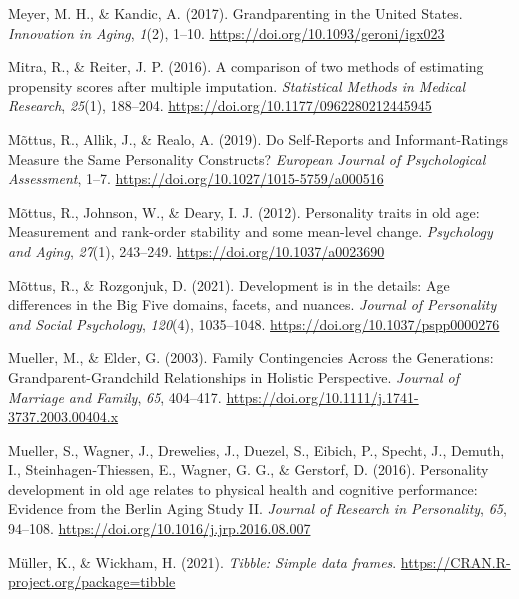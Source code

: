 \documentclass[
  english,
  man,floatsintext]{apa7}
\begin{document}
\leavevmode\hypertarget{ref-meyerGrandparentingUnitedStates2017}{}%
Meyer, M. H., \& Kandic, A. (2017). Grandparenting in the United States. \emph{Innovation in Aging}, \emph{1}(2), 1--10. \url{https://doi.org/10.1093/geroni/igx023}

\leavevmode\hypertarget{ref-mitraComparisonTwoMethods2016}{}%
Mitra, R., \& Reiter, J. P. (2016). A comparison of two methods of estimating propensity scores after multiple imputation. \emph{Statistical Methods in Medical Research}, \emph{25}(1), 188--204. \url{https://doi.org/10.1177/0962280212445945}

\leavevmode\hypertarget{ref-mottusSelfReportsInformantRatingsMeasure2019}{}%
Mõttus, R., Allik, J., \& Realo, A. (2019). Do Self-Reports and Informant-Ratings Measure the Same Personality Constructs? \emph{European Journal of Psychological Assessment}, 1--7. \url{https://doi.org/10.1027/1015-5759/a000516}

\leavevmode\hypertarget{ref-mottusPersonalityTraitsOld2012}{}%
Mõttus, R., Johnson, W., \& Deary, I. J. (2012). Personality traits in old age: Measurement and rank-order stability and some mean-level change. \emph{Psychology and Aging}, \emph{27}(1), 243--249. \url{https://doi.org/10.1037/a0023690}

\leavevmode\hypertarget{ref-mottusDevelopmentDetailsAge2021}{}%
Mõttus, R., \& Rozgonjuk, D. (2021). Development is in the details: Age differences in the Big Five domains, facets, and nuances. \emph{Journal of Personality and Social Psychology}, \emph{120}(4), 1035--1048. \url{https://doi.org/10.1037/pspp0000276}

\leavevmode\hypertarget{ref-muellerFamilyContingenciesGenerations2003}{}%
Mueller, M., \& Elder, G. (2003). Family Contingencies Across the Generations: Grandparent-Grandchild Relationships in Holistic Perspective. \emph{Journal of Marriage and Family}, \emph{65}, 404--417. \url{https://doi.org/10.1111/j.1741-3737.2003.00404.x}

\leavevmode\hypertarget{ref-muellerPersonalityDevelopmentOld2016}{}%
Mueller, S., Wagner, J., Drewelies, J., Duezel, S., Eibich, P., Specht, J., Demuth, I., Steinhagen-Thiessen, E., Wagner, G. G., \& Gerstorf, D. (2016). Personality development in old age relates to physical health and cognitive performance: Evidence from the Berlin Aging Study II. \emph{Journal of Research in Personality}, \emph{65}, 94--108. \url{https://doi.org/10.1016/j.jrp.2016.08.007}

\leavevmode\hypertarget{ref-R-tibble}{}%
Müller, K., \& Wickham, H. (2021). \emph{Tibble: Simple data frames}. \url{https://CRAN.R-project.org/package=tibble}
\end{document}
